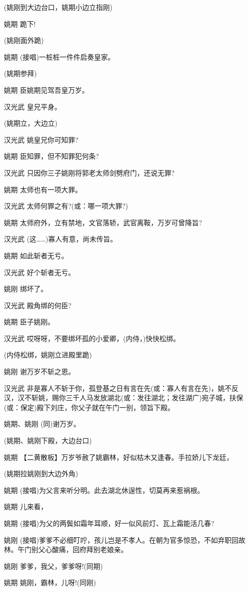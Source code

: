(姚刚到大边台口，姚期小边立指刚)

姚期 跪下!

(姚刚面外跪)

姚期 (接唱)一桩桩一件件启奏皇家。

(姚期参拜)

姚期 臣姚期见驾吾皇万岁。

汉光武 皇兄平身。

(姚期立，大边立)

汉光武 姚皇兄你可知罪?

姚期 臣知罪，但不知罪犯何条?

汉光武 只因你三子姚刚将郭老太师剑劈府门，还说无罪?

姚期 太师也有一项大罪。

汉光武 太师何罪之有?(或：哪一项大罪?)

姚期 太师府外，立有禁地，文官落轿，武官离鞍，万岁可曾降旨?

汉光武 (这\ldots{}\ldots{})寡人有意，尚未传旨。

姚期 如此斩者无亏。

汉光武 好个斩者无亏。

姚刚 绑坏了。

汉光武 殿角绑的何臣?

姚期 臣子姚刚。

汉光武 哎呀呀，不要绑坏孤的小爱卿，(内侍，)快快松绑。

(内侍松绑，姚刚立进殿里跪)

姚刚 谢万岁不斩之恩。

汉光武
非是寡人不斩于你，孤登基之日有言在先(或：寡人有言在先)，姚不反汉，汉不斩姚，赐你三千人马发放湖北(或：发往湖北；发往湖广)宛子城，扶保(或：保定)殿下刘庄，你父子就在午门一别，领旨下殿。

姚期、姚刚 (同)谢万岁。

(姚期、姚刚下殿，大边台口)

姚期 【二黄散板】万岁爷赦了姚霸林，好似枯木又逢春。手拉娇儿下龙廷，

(姚期拉姚刚到大边外角)

姚期 (接唱)为父言来听分明。此去湖北休逞性，切莫再来惹祸根。

姚期 儿来看，

姚期 (接唱)为父的两鬓如霜年耳顺，好一似风前灯、瓦上霜能活几春?

姚刚
(接唱)爹爹不必细叮咛，孩儿岂是不孝人。在朝为官多惊恐，不如弃职回故林。午门别父心酸痛，回府拜别老娘亲。

姚刚 爹爹，我父，爹爹呀!(同期)

姚期 姚刚，霸林，儿呀!(同刚)

